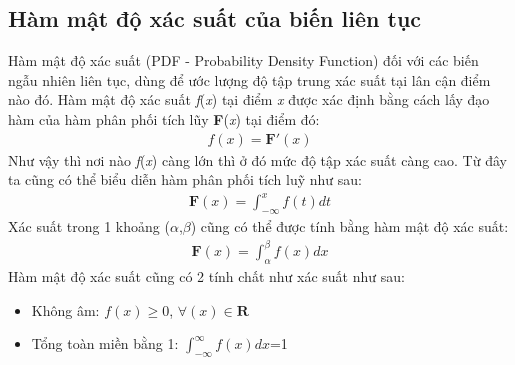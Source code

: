 \subsection{Hàm mật độ xác suất của biến liên tục}\label{subsec:1.2.2}
Hàm mật độ xác suất (PDF - Probability Density Function) đối với các biến ngẫu nhiên liên tục, dùng để ước lượng độ tập trung xác suất tại lân cận điểm nào đó.
Hàm mật độ xác suất \textit{f}(\textit{x}) tại điểm \textit{x} được xác định bằng cách lấy đạo hàm của hàm phân phối tích lũy \textbf{F}(\textit{x}) tại điểm đó:
\begin{align}
	\textit{f}(x)=\textbf{F}'(x)
\end{align}
Như vậy thì nơi nào \textit{f}(\textit{x}) càng lớn thì ở đó mức độ tập xác suất càng cao. 
Từ đây ta cũng có thể biểu diễn hàm phân phối tích luỹ như sau: 
\begin{align}
	\textbf{F}(x)=\int_{-\infty}^{x}\textit{f}(t)dt
\end{align}
Xác suất trong 1 khoảng ($\alpha$,$\beta$) cũng có thể được tính bằng hàm mật độ xác suất: 
\begin{align}
	\textbf{F}(x)=\int_{\alpha}^{\beta}\textit{f}(x)dx
\end{align}
Hàm mật độ xác suất cũng có 2 tính chất như xác suất như sau:
\begin{itemize}
	\item Không âm: $\textit{f}(x)\geq$0, $\forall(x)\in\textbf{R}$
	\item Tổng toàn miền bằng 1: $\int_{-\infty}^{\infty}\textit{f}(x)\textit{dx}$=1
\end{itemize}
\par
